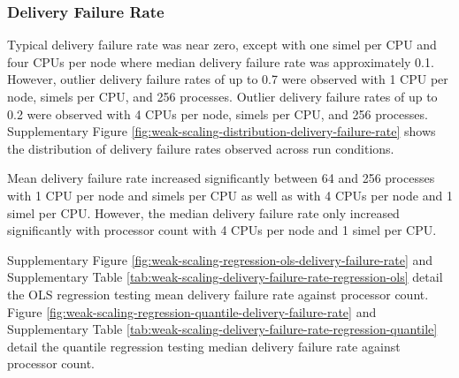 \subsubsection{Delivery Failure Rate}

Typical delivery failure rate was near zero, except with one simel per CPU and four CPUs per node where median delivery failure rate was approximately 0.1.
However, outlier delivery failure rates of up to 0.7 were observed with 1 CPU per node,  simels per CPU, and 256 processes.
Outlier delivery failure rates of up to 0.2 were observed with 4 CPUs per node,  simels per CPU, and 256 processes.
Supplementary Figure \ref{fig:weak-scaling-distribution-delivery-failure-rate} shows the distribution of delivery failure rates observed across run conditions.

Mean delivery failure rate increased significantly between 64 and 256 processes with 1 CPU per node and  simels per CPU as well as with 4 CPUs per node and 1 simel per CPU.
However, the median delivery failure rate only increased significantly with processor count with 4 CPUs per node and 1 simel per CPU.



Supplementary Figure \ref{fig:weak-scaling-regression-ols-delivery-failure-rate} and Supplementary Table \ref{tab:weak-scaling-delivery-failure-rate-regression-ols} detail the OLS regression testing mean delivery failure rate against processor count.
Figure \ref{fig:weak-scaling-regression-quantile-delivery-failure-rate} and Supplementary Table \ref{tab:weak-scaling-delivery-failure-rate-regression-quantile} detail the quantile regression testing median delivery failure rate against processor count.
